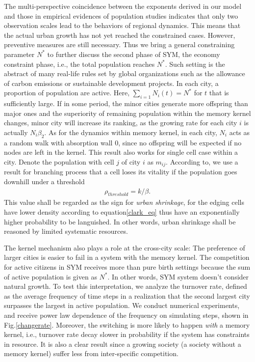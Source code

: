 \documentclass[reprint,unsortedaddress,amsmath,amssymb,aps,prl,showkeys]{revtex4-2}
\begin{document}
The multi-perspective coincidence between the exponents derived in our model and those in empirical evidences of population studies indicates that only two observation scales lead to the behaviors of regional dynamics. This means that the actual urban growth has not yet reached the constrained cases. However, preventive measures are still necessary. Thus we bring a general constraining parameter $N^*$ to further discuss the second phase of SYM, the economy constraint phase, i.e., the total population reaches $N^*$. Such setting is the abstract of many real-life rules set by global organizations such as the allowance of carbon emissions or sustainable development projects. In each city, a proportion of population are active. Here, $\sum_{i=1} N_i(t) = N^*$ for $t$ that is sufficiently large. If in some period, the minor cities generate more offspring than major ones and the superiority of remaining population within the memory kernel changes, minor city will increase its ranking, as the growing rate for each city $i$ is actually $N_i\beta_2$. As for the dynamics within memory kernel, in each city, $N_i$ acts as a random walk with absorption wall $0$, since no offspring will be expected if no nodes are left in the kernel. This result also works for single cell case within a city. Denote the population with cell $j$ of city $i$ as $m_{ij}$. According to\@\cite{durrett1999essentials}, we use a result for branching process that a cell loses its vitality if the population goes downhill under a threshold \begin{align}\rho_{threshold} = k/\beta.\end{align} This value shall be regarded as the sign for \emph{urban shrinkage}, for the edging cells have lower density according to equation\@\ref{clark_eq} thus have an exponentially higher probability to be languished. In other words, urban shrinkage shall be reasoned by limited systematic resources. 

The kernel mechanism also plays a role at the cross-city scale: The preference of larger cities is easier to fail in a system with the memory kernel. The competition for active citizens in SYM receives more than pure birth settings because the sum of active population is given as $N^*$. In other words, SYM system doesn't consider natural growth. To test this interpretation, we analyze the turnover rate, defined as the average frequency of time steps in a realization that the second largest city surpasses the largest in active population. We conduct numerical experiments, and receive power law dependence of the frequency on simulating steps, shown in Fig.\@\ref{changerate}. Moreover, the switching is more likely to happen \textit{with} a memory kernel, i.e., turnover rate decay slower in probability if the system has constraints in resource. It is also a clear result since a growing society (a society without a memory kernel) suffer less from inter-specific competition.
\end{document}
